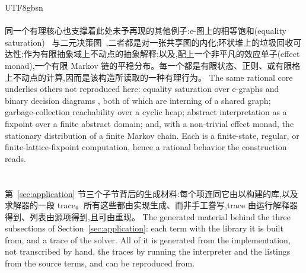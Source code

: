 \begin{CJK*}{UTF8}{gbsn}
  \paragraph{}
  \ifTablambdaChinese
  同一个有理核心也支撑着此处未予再现的其他例子:e-图上的相等饱和(equality saturation)~\cite{willsey2021-egg, zhang2023-egglog} 与二元决策图~\cite{bryant1986-bdd},二者都是对一张共享图的内化;环状堆上的垃圾回收可达性;作为有限抽象域上不动点的抽象解释;以及,配上一个非平凡的效应单子(effect monad),一个有限 Markov 链的平稳分布。每一个都是有限状态、正则、或有限格上不动点的计算,因而是该构造所读取的一种有理行为。
  \else
  The same rational core underlies others not reproduced here: equality saturation over e-graphs
  \cite{willsey2021-egg, zhang2023-egglog} and binary decision diagrams \cite{bryant1986-bdd}, both of which are interning of a shared graph; garbage-collection reachability over a cyclic heap; abstract interpretation as a fixpoint over a finite abstract domain; and, with a non-trivial effect monad, the stationary distribution of a finite Markov chain. Each is a finite-state, regular, or finite-lattice-fixpoint computation, hence a rational behavior the construction reads.
  \fi

  \section{}\label{app:examples}
  \ifTablambdaChinese
  第~\ref{sec:application} 节三个子节背后的生成材料:每个项连同它由以构建的库,以及求解器的一段 trace。所有这些都由实现生成、而非手工誊写,trace 由运行解释器得到、列表由源项得到,且可由重现。
  \else
  The generated material behind the three subsections of Section~\ref{sec:application}: each term with the library it is built from, and a trace of the solver. All of it is generated from the implementation, not transcribed by hand, the traces by running the interpreter and the listings from the source terms, and can be reproduced from.
  \fi


\end{CJK*}
